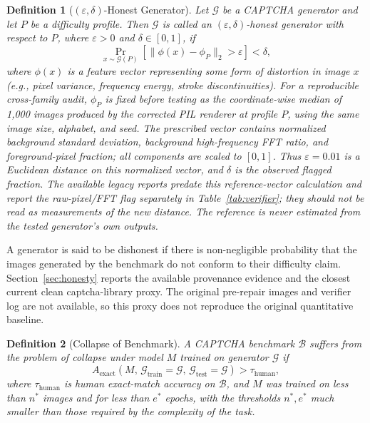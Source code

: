 \documentclass[pdflatex,sn-mathphys-num,iicol]{sn-jnl}
\newtheorem{definition}{Definition}
\begin{document}
\begin{definition}[$(\varepsilon, \delta)$-Honest Generator]
Let $\mathcal{G}$ be a CAPTCHA generator and let $P$ be a difficulty
profile. Then $\mathcal{G}$ is called an $(\varepsilon, \delta)$-honest
generator with respect to $P$, where $\varepsilon > 0$ and $\delta \in [0, 1]$,
if
\begin{equation}
  \Pr_{x \sim \mathcal{G}(P)}\!\left[
    \bigl\|\phi(x) - \phi_P\bigr\|_2 > \varepsilon
  \right] < \delta,
\end{equation}
where $\phi(x)$ is a feature vector representing some form of distortion in
image $x$ (e.g., pixel variance, frequency energy, stroke discontinuities).
For a reproducible cross-family audit, $\phi_P$ is fixed before testing as the
coordinate-wise median of 1,000 images produced by the corrected PIL renderer
at profile $P$, using the same image size, alphabet, and seed. The prescribed
vector contains normalized background standard deviation, background
high-frequency FFT ratio, and foreground-pixel fraction; all components are
scaled to $[0,1]$. Thus $\varepsilon=0.01$ is a Euclidean distance on this
normalized vector, and $\delta$ is the observed flagged fraction. The
available legacy reports predate this reference-vector calculation and report
the raw-pixel/FFT flag separately in Table~\ref{tab:verifier}; they should not
be read as measurements of the new distance. The reference is never estimated
from the tested generator's own outputs.
\end{definition}

\noindent A generator is said to be dishonest if there is non-negligible probability
that the images generated by the benchmark do not conform to their
difficulty claim. Section~\ref{sec:honesty} reports the available provenance evidence and the
closest current clean captcha-library proxy. The original pre-repair images and
verifier log are not available, so this proxy does not reproduce the original
quantitative baseline.

\begin{definition}[Collapse of Benchmark]
A CAPTCHA benchmark $\mathcal{B}$ suffers from the problem of \emph{collapse}
under model $M$ trained on generator $\mathcal{G}$ if
\begin{equation}
  A_{\mathrm{exact}}(M,\, \mathcal{G}_{\mathrm{train}}=\mathcal{G},\,
  \mathcal{G}_{\mathrm{test}}=\mathcal{G}) > \tau_{\mathrm{human}},
\end{equation}
where $\tau_{\mathrm{human}}$ is human exact-match accuracy on $\mathcal{B}$,
and $M$ was trained on less than $n^*$ images and for less than $e^*$ epochs,
with the thresholds $n^*, e^*$ much smaller than those required by the
complexity of the task.
\end{definition}
\end{document}
